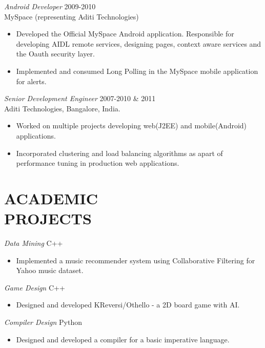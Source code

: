 \documentclass[line,margin]{res}
\begin{document}
\begin{resume}
                {\sl Android Developer} \hfill            2009-2010 \\
                MySpace (representing Aditi Technologies) 
                 \begin{itemize}  \itemsep -2pt %
                 \item Developed the Official MySpace Android application. Responsible for developing AIDL
remote services, designing pages, context aware services and the Oauth security layer. 
 \item Implemented and consumed Long Polling in the MySpace mobile application for alerts.
                 \end{itemize} 
                {\sl Senior Development Engineer} \hfill        2007-2010 \& 2011 \\
                Aditi Technologies, Bangalore, India.
                  \begin{itemize}
                   \item Worked on multiple projects developing web(J2EE) and mobile(Android) applications.
                    \item Incorporated clustering and load balancing algorithms as apart of performance tuning in production web applications. 
                   \end{itemize} 

 
\section{ACADEMIC \\ PROJECTS}  {\sl Data Mining} \hfill        C++
                 \begin{itemize}  \itemsep -2pt %
                 \item Implemented a music recommender system using Collaborative Filtering for Yahoo music dataset.
                 \end{itemize} 
                {\sl Game Design}  \hfill        C++
                  \begin{itemize} \itemsep -2pt
                   \item Designed and developed KReversi/Othello - a 2D board game with AI.        
                   \end{itemize} 
                   {\sl Compiler Design}  \hfill        Python
                  \begin{itemize} \itemsep -2pt
                   \item Designed and developed a compiler for a basic imperative language.       
                   \end{itemize}
 

\end{resume}
\end{document}
